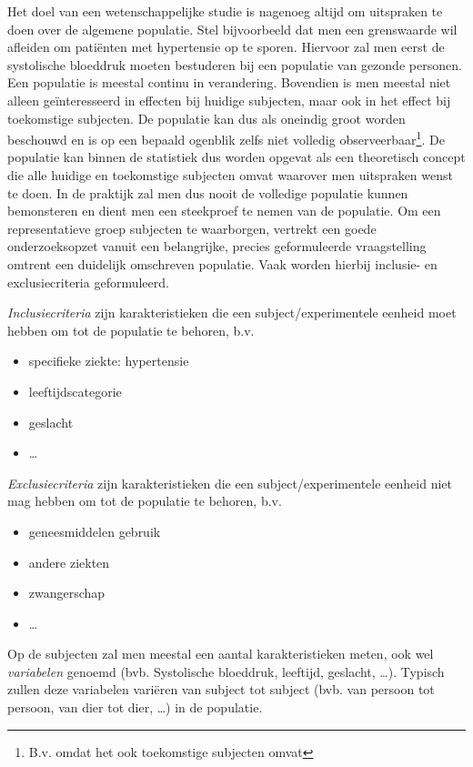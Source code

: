 \documentclass[
  12pt,dutch,coursenotes]{book}
\providecommand{\tightlist}{%
  \setlength{\itemsep}{0pt}\setlength{\parskip}{0pt}}
\theoremstyle{definition}
\theoremstyle{definition}
\theoremstyle{definition}
\theoremstyle{remark}
\begin{document}
Het doel van een wetenschappelijke studie is nagenoeg altijd om uitspraken te doen over de algemene populatie.
Stel bijvoorbeeld dat men een grenswaarde wil afleiden om patiënten met hypertensie op te sporen.
Hiervoor zal men eerst de systolische bloeddruk moeten bestuderen bij een populatie van gezonde personen.
Een populatie is meestal continu in verandering.
Bovendien is men meestal niet alleen geïnteresseerd in effecten bij huidige subjecten, maar ook in het effect bij toekomstige subjecten.
De populatie kan dus als oneindig groot worden beschouwd en is op een bepaald ogenblik zelfs niet volledig observeerbaar\footnote{B.v. omdat het ook toekomstige subjecten omvat}.
De populatie kan binnen de statistiek dus worden opgevat als een theoretisch concept die alle huidige en toekomstige subjecten omvat waarover men uitspraken wenst te doen.
In de praktijk zal men dus nooit de volledige populatie kunnen bemonsteren en dient men een steekproef te nemen van de populatie.
Om een representatieve groep subjecten te waarborgen, vertrekt een goede onderzoeksopzet vanuit een belangrijke, precies geformuleerde vraagstelling
omtrent een duidelijk omschreven populatie.
Vaak worden hierbij inclusie- en exclusiecriteria geformuleerd.

\emph{Inclusiecriteria} zijn karakteristieken die een subject/experimentele eenheid moet hebben om tot de populatie te behoren, b.v.

\begin{itemize}
\tightlist
\item
  specifieke ziekte: hypertensie
\item
  leeftijdscategorie
\item
  geslacht
\item
  \ldots{}
\end{itemize}

\emph{Exclusiecriteria} zijn karakteristieken die een subject/experimentele eenheid niet mag hebben om tot de populatie te behoren, b.v.

\begin{itemize}
\tightlist
\item
  geneesmiddelen gebruik
\item
  andere ziekten
\item
  zwangerschap
\item
  \ldots{}
\end{itemize}

Op de subjecten zal men meestal een aantal karakteristieken meten, ook wel \emph{variabelen} genoemd (bvb. Systolische bloeddruk, leeftijd, geslacht, \ldots). Typisch zullen deze variabelen variëren van subject tot subject (bvb. van persoon tot persoon, van dier tot dier, \ldots) in de populatie.
\end{document}
